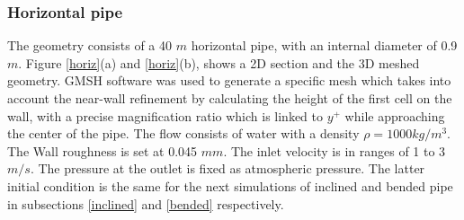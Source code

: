 \documentclass[11pt]{report}
\begin{document}
 \subsubsection{Horizontal pipe}
The geometry consists of a 40 $m$ horizontal pipe, with an internal diameter of 0.9 $m$. 
%
Figure \ref{horiz}(a) and \ref{horiz}(b), shows a 2D section and the 3D meshed geometry. 
%
GMSH software was used to generate a specific mesh which takes into account the near-wall refinement by calculating the height of the first cell on the wall, with a precise magnification ratio which is linked to $y^{+}$ while approaching the center of the pipe. 
%
The flow consists of water with a density $\rho=1000 kg/m^3$. 
%
The Wall roughness is set at 0.045 $mm$. The inlet velocity is in ranges of 1 to 3 $m/s$. 
%
The pressure at the outlet is fixed as atmospheric pressure. The latter initial condition is the same for the next simulations of inclined and bended pipe in subsections \ref{inclined} and \ref{bended} respectively.
%
\end{document}
